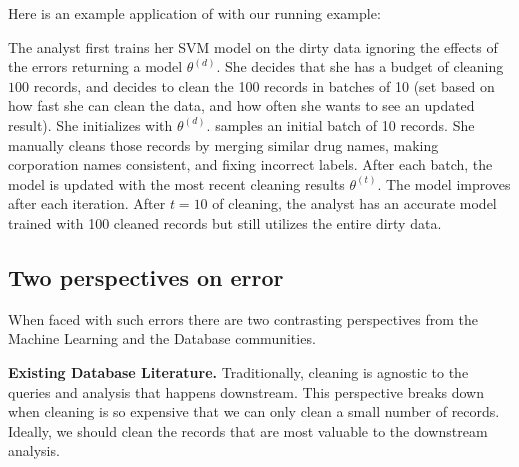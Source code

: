 \iffalse
Here is an example application of \sys with our running example:
\begin{example}
The analyst first trains her SVM model on the dirty data ignoring the effects of the errors returning a model $\theta^{(d)}$.
She decides that she has a budget of cleaning $100$ records, and decides to clean the 100 records in batches of 10 (set based on how fast she can clean the data, and how often she wants to see an updated result).
She initializes \sys with $\theta^{(d)}$.
\sys samples an initial batch of 10 records.
She manually cleans those records by merging similar drug names, making corporation names consistent, and fixing incorrect labels.
After each batch, the model is updated with the most recent cleaning results $\theta^{(t)}$.
The model improves after each iteration.
After $t=10$ of cleaning, the analyst has an accurate model trained with 100 cleaned records but still utilizes the entire dirty data.
\end{example}



\subsection{Two perspectives on error}
When faced with such errors there are two contrasting perspectives from the Machine Learning and the Database communities.

\vspace{0.5em}

\noindent\textbf{Existing Database Literature. } 
Traditionally, cleaning is agnostic to the queries and analysis that happens downstream. 
This perspective breaks down when cleaning is so expensive that we can only clean a small number of records.
Ideally, we should clean the records that are most valuable to the downstream analysis.

